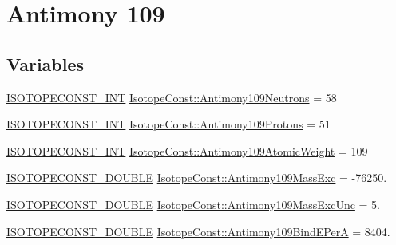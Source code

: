 \hypertarget{group___isotope_const-_antimony-_sb109}{}\section{Antimony 109}
\label{group___isotope_const-_antimony-_sb109}
\subsection*{Variables}
\begin{DoxyCompactItemize}
\item 
\mbox{\hyperlink{group___isotope_const-_macros_ga5f18360b3e99483a35c32d789e62621c}{I\+S\+O\+T\+O\+P\+E\+C\+O\+N\+S\+T\+\_\+\+I\+NT}} \mbox{\hyperlink{group___isotope_const-_antimony-_sb109_ga6161f133facb824ea10629b74d246851}{Isotope\+Const\+::\+Antimony109\+Neutrons}} = 58
\item 
\mbox{\hyperlink{group___isotope_const-_macros_ga5f18360b3e99483a35c32d789e62621c}{I\+S\+O\+T\+O\+P\+E\+C\+O\+N\+S\+T\+\_\+\+I\+NT}} \mbox{\hyperlink{group___isotope_const-_antimony-_sb109_ga9418dbda96f2aaabc75ecd9682a488e2}{Isotope\+Const\+::\+Antimony109\+Protons}} = 51
\item 
\mbox{\hyperlink{group___isotope_const-_macros_ga5f18360b3e99483a35c32d789e62621c}{I\+S\+O\+T\+O\+P\+E\+C\+O\+N\+S\+T\+\_\+\+I\+NT}} \mbox{\hyperlink{group___isotope_const-_antimony-_sb109_ga56aa13bf3d0559f9d2cc09cb59a46014}{Isotope\+Const\+::\+Antimony109\+Atomic\+Weight}} = 109
\item 
\mbox{\hyperlink{group___isotope_const-_macros_ga8f45a7272ce02c0b4c65c44636ed719a}{I\+S\+O\+T\+O\+P\+E\+C\+O\+N\+S\+T\+\_\+\+D\+O\+U\+B\+LE}} \mbox{\hyperlink{group___isotope_const-_antimony-_sb109_ga3830449be9d02b366e9afd560ee34f5a}{Isotope\+Const\+::\+Antimony109\+Mass\+Exc}} = -\/76250.
\item 
\mbox{\hyperlink{group___isotope_const-_macros_ga8f45a7272ce02c0b4c65c44636ed719a}{I\+S\+O\+T\+O\+P\+E\+C\+O\+N\+S\+T\+\_\+\+D\+O\+U\+B\+LE}} \mbox{\hyperlink{group___isotope_const-_antimony-_sb109_gaecfeaf011d7c81f30a5f9389cc5b19b9}{Isotope\+Const\+::\+Antimony109\+Mass\+Exc\+Unc}} = 5.
\item 
\mbox{\hyperlink{group___isotope_const-_macros_ga8f45a7272ce02c0b4c65c44636ed719a}{I\+S\+O\+T\+O\+P\+E\+C\+O\+N\+S\+T\+\_\+\+D\+O\+U\+B\+LE}} \mbox{\hyperlink{group___isotope_const-_antimony-_sb109_ga483110d1c78e16aa58559047acc18207}{Isotope\+Const\+::\+Antimony109\+Bind\+E\+PerA}} = 8404.
\item 

\end{DoxyCompactItemize}
